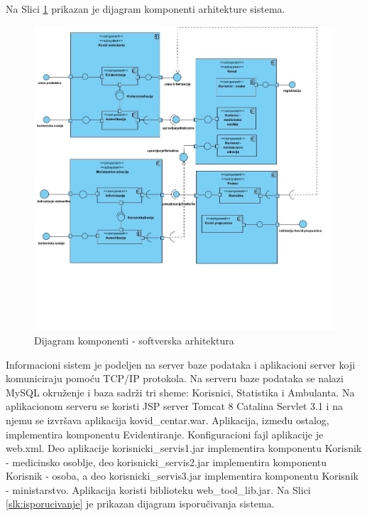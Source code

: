 \documentclass[titlepage]{article}
\begin{document}
Na Slici \ref{slk:komponente} prikazan je dijagram komponenti arhitekture sistema.

\begin{figure}[H]
\centering
\includegraphics[scale=0.65]{Dijagram_komponenti}
\caption{Dijagram komponenti - softverska arhitektura}
\label{slk:komponente}
\end{figure}

Informacioni sistem je podeljen na server baze podataka i aplikacioni server koji komuniciraju pomoću TCP/IP protokola. Na serveru baze podataka se nalazi MySQL okruženje i baza sadrži tri sheme: Korisnici, Statistika i Ambulanta. Na aplikacionom serveru se koristi JSP server Tomcat 8 Catalina Servlet 3.1 i na njemu se izvršava aplikacija kovid\_centar.war. Aplikacija, između ostalog, implementira komponentu Evidentiranje. Konfiguracioni fajl aplikacije je web.xml. Deo aplikacije korisnicki\_servis1.jar implementira komponentu Korisnik - medicinsko osoblje, deo korisnicki\_servis2.jar implementira komponentu Korisnik - osoba, a deo korisnicki\_servis3.jar implementira komponentu Korisnik - ministarstvo. Aplikacija koristi biblioteku web\_tool\_lib.jar. Na Slici \ref{slk:isporucivanje} je prikazan dijagram isporučivanja sistema.
\end{document}
